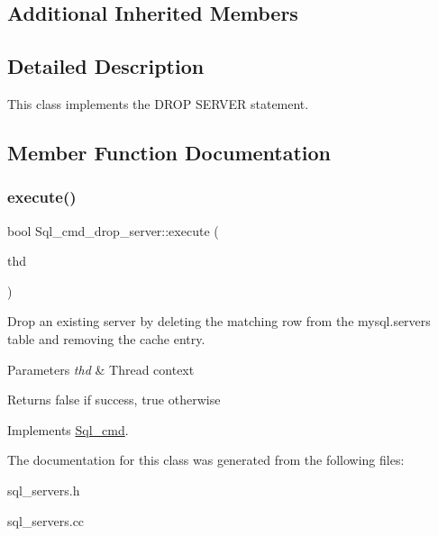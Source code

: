 \subsection*{Additional Inherited Members}


\subsection{Detailed Description}
This class implements the D\+R\+OP S\+E\+R\+V\+ER statement. 

\subsection{Member Function Documentation}
\mbox{\label{classSql__cmd__drop__server_a19ff682e57c46d10212a552e97806270}} 
\subsubsection{\texorpdfstring{execute()}{execute()}}
{\footnotesize\ttfamily bool Sql\+\_\+cmd\+\_\+drop\+\_\+server\+::execute (\begin{DoxyParamCaption}\item[{T\+HD $\ast$}]{thd }\end{DoxyParamCaption})\hspace{0.3cm}{\ttfamily [virtual]}}

Drop an existing server by deleting the matching row from the mysql.\+servers table and removing the cache entry.


\begin{DoxyParams}{Parameters}
{\em thd} & Thread context\\
\hline
\end{DoxyParams}
\begin{DoxyReturn}{Returns}
false if success, true otherwise 
\end{DoxyReturn}


Implements \mbox{\hyperlink{classSql__cmd_a213367b79b551296fbb7790f2a3732fb}{Sql\+\_\+cmd}}.



The documentation for this class was generated from the following files\+:\begin{DoxyCompactItemize}
\item 
sql\+\_\+servers.\+h\item 
sql\+\_\+servers.\+cc\end{DoxyCompactItemize}
